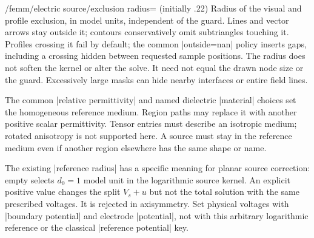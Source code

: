 \begin{key}{/femm/electric source/exclusion radius= (initially .22)}
Radius of the visual and profile exclusion, in model units, independent of the
guard. Lines and vector arrows stay outside it; contours conservatively omit
subtriangles touching it. Profiles crossing it fail by default; the common
|outside=nan| policy inserts gaps, including a crossing hidden between requested
sample positions. The radius does not soften the kernel or alter the solve.
It need not equal the drawn node size or the guard. Excessively large masks
can hide nearby interfaces or entire field lines.
\end{key}

The common |relative permittivity| and named dielectric |material| choices set
the homogeneous reference medium. Region paths may replace it with another
positive scalar permittivity. Tensor entries must describe an isotropic medium;
rotated anisotropy is not supported here. A source must stay in the reference
medium even if another region elsewhere has the same shape or name.

The existing |reference radius| has a specific meaning for planar source
correction: empty selects $d_0=1$ model unit in the logarithmic source kernel.
An explicit positive value changes the split $V_s+u$ but not the total solution
with the same prescribed voltages. It is rejected in axisymmetry. Set physical
voltages with |boundary potential| and electrode |potential|, not with this
arbitrary logarithmic reference or the classical |reference potential| key.

